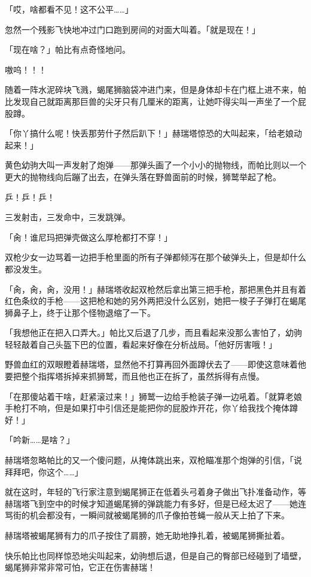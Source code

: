 「哎，啥都看不见！这不公平……」

忽然一个残影飞快地冲过门口跑到房间的对面大叫着。「就是现在！」

「现在啥？」帕比有点奇怪地问。

嗷呜！！！

随着一阵水泥碎块飞溅，蝎尾狮脑袋冲进门来，但是身体却卡在门框上进不来，帕比发现自己就距离那巨兽的尖牙只有几厘米的距离，让她吓得尖叫一声坐了一个屁股蹲。

「你丫搞什么呢！快丢那劳什子然后趴下！」赫瑞塔惊恐的大叫起来，「给老娘动起来！」

黄色幼驹大叫一声发射了炮弹——那弹头画了一个小小的抛物线，而帕比则以一个更大的抛物线向后蹦了出去，在弹头落在野兽面前的时候，狮鹫举起了枪。

乒！乒！乒！


三发射击，三发命中，三发跳弹。

「肏！谁尼玛把弹壳做这么厚枪都打不穿！」

双枪少女一边骂着一边把手枪里面的所有子弹都倾泻在那个破弹头上，但是却什么都没发生。

「肏，肏，肏，没用！」赫瑞塔收起双枪然后拿出第三把手枪，那把黑色并且有着红色条纹的手枪——这把枪和她的另外两把没什么区别，她把一梭子子弹打在蝎尾狮鼻子上，终于让那个怪物退缩了一下。

「我想他正在把入口弄大。」帕比又后退了几步，而且看起来没那么害怕了，幼驹轻轻敲着自己头盔下巴的位置，看起来好像在分析战局。「他好厉害哦！」

野兽血红的双眼瞪着赫瑞塔，显然他不打算再回外面蹲伏去了——即使这意味着他要把整个指挥塔拆掉来抓狮鹫，而且他也正在拆了，虽然拆得有点慢。

「在那傻站着干啥，赶紧滚过来！」狮鹫一边给手枪装子弹一边吼着。「就算老娘手枪打不响，但是如果打中引信还是能把你的屁股炸开花，你丫给我找个掩体蹲好！」

「吟新……是啥？」

赫瑞塔忽略帕比的又一个傻问题，从掩体跳出来，双枪瞄准那个炮弹的引信，「说拜拜吧，你这个……」

就在这时，年轻的飞行家注意到蝎尾狮正在低着头弓着身子做出飞扑准备动作，等赫瑞塔飞到空中的时候才知道蝎尾狮的弹跳能力有多好，但是已经太迟了——她连骂街的机会都没有，一瞬间就被蝎尾狮的爪子像拍苍蝇一般从天上拍了下来。

赫瑞塔被蝎尾狮有力的爪子按住了肩膀，她无助地挣扎着，被蝎尾狮撕扯着。

快乐帕比也同样惊恐地尖叫起来，幼驹想后退，但是自己的臀部已经碰到了墙壁，蝎尾狮非常非常可怕，它正在伤害赫瑞！

